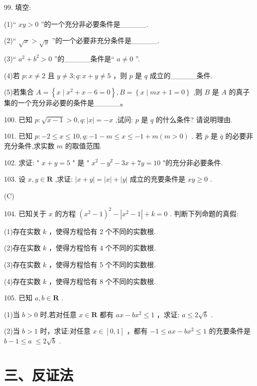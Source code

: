 \documentclass[10pt]{article}
\begin{document}
99. 填空:

(1)“ \({xy} > 0\) ”的一个充分非必要条件是\_\_\_\_\_.

(2)“ \(\sqrt{x} > \sqrt{y}\) ”的一个必要非充分条件是\_\_\_\_\_.

(3)“ \({a}^{2} + {b}^{2} > 0\) ”的\_\_\_\_\_条件是“ \(a \neq  0\) ”.

(4)若 \(p : x \neq  2\) 且 \(y \neq  3;q : x + y \neq  5\) ，则 \(p\) 是 \(q\) 成立的\_\_\_\_\_条件.

(5)若集合 \(A = \left\{  {x \mid  {x}^{2} + x - 6 = 0}\right\}  ,B = \left\{  {x \mid  {mx} + 1 = 0}\right\}\) ,则 \(B\) 是 \(A\) 的真子集的一个充分非必要的条件是\_\_\_\_\_。

100. 已知 \(p : \sqrt{x - 1} > 0,q : \left| x\right|  =  - x\) ,试问: \(p\) 是 \(q\) 的什么条件? 请说明理由.

101. 已知 \(p :  - 2 \leq  x \leq  {10},q :  - 1 - m \leq  x \leq   - 1 + m\left( {m > 0}\right)\) . 若 \(\bar{p}\) 是 \(\bar{q}\) 的必要非充分条件,求实数 \(m\) 的取值范围.

102. 求证: " \(x + y = 5\) " 是 " \({x}^{2} - {y}^{2} - {3x} + {7y} = {10}\) "的充分非必要条件.

103. 设 \(x,y \in  \mathbf{R}\) ,求证: \(\left| {x + y}\right|  = \left| x\right|  + \left| y\right|\) 成立的充要条件是 \({xy} \geq  0\) .

(C)

104. 已知关于 \(x\) 的方程 \({\left( {x}^{2} - 1\right) }^{2} - \left| {{x}^{2} - 1}\right|  + k = 0\) . 判断下列命题的真假:

(1)存在实数 \(k\) ，使得方程恰有 2 个不同的实数根.

(2)存在实数 \(k\) ，使得方程恰有 4 个不同的实数根.

(3)存在实数 \(k\) ，使得方程恰有 5 个不同的实数根.

(4)存在实数 \(k\) ，使得方程恰有 8 个不同的实数根.

105. 已知 \(a,b \in  \mathbf{R}\) .

(1)当 \(b > 0\) 时,若对任意 \(x \in  \mathbf{R}\) 都有 \({ax} - b{x}^{2} \leq  1\) ，求证: \(a \leq  2\sqrt{b}\) .

(2)当 \(b > 1\) 时，求证:对任意 \(x \in  \left\lbrack  {0,1}\right\rbrack\) ，都有 \(- 1 \leq  {ax} - b{x}^{2} \leq  1\) 的充要条件是 \(b - 1 \leq  a \; \leq  2\sqrt{b}\) .

\section*{三、反证法}
\end{document}
